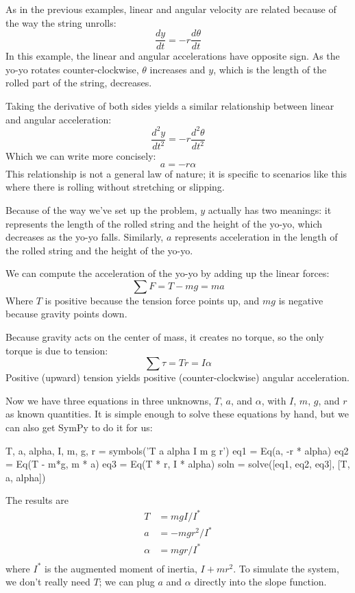 \documentclass[12pt]{book}
\theoremstyle{exercise}
\begin{document}
As in the previous examples, linear and angular velocity are related because of the way the string unrolls:
%
\[ \frac{dy}{dt} = -r \frac{d \theta}{dt} \]
%
In this example, the linear and angular accelerations have opposite sign.  As the yo-yo rotates counter-clockwise, $\theta$ increases and $y$, which is the length of the rolled part of the string, decreases.

Taking the derivative of both sides yields a similar relationship between linear and angular acceleration:
%
\[ \frac{d^2 y}{dt^2} = -r \frac{d^2 \theta}{dt^2} \]
%
Which we can write more concisely:
%
\[ a = -r \alpha \]
%
This relationship is not a general law of nature; it is specific to scenarios like this where there is rolling without stretching or slipping.


Because of the way we've set up the problem, $y$ actually has two meanings: it represents the length of the rolled string and the height of the yo-yo, which decreases as the yo-yo falls.  Similarly, $a$ represents acceleration in the length of the rolled string and the height of the yo-yo.

We can compute the acceleration of the yo-yo by adding up the linear forces:
%
\[ \sum F = T - mg = ma \]
%
Where $T$ is positive because the tension force points up, and $mg$ is negative because gravity points down.

Because gravity acts on the center of mass, it creates no torque, so the only torque is due to tension:
%
\[ \sum \tau = T r = I \alpha \]
%
Positive (upward) tension yields positive (counter-clockwise) angular acceleration.


Now we have three equations in three unknowns, $T$, $a$, and $\alpha$, with $I$, $m$, $g$, and $r$ as known quantities.  It is simple enough to solve these equations by hand, but we can also get SymPy to do it for us:

\begin{python}
T, a, alpha, I, m, g, r = symbols('T a alpha I m g r')
eq1 = Eq(a, -r * alpha)
eq2 = Eq(T - m*g, m * a)
eq3 = Eq(T * r, I * alpha)
soln = solve([eq1, eq2, eq3], [T, a, alpha])
\end{python}

The results are
%
\begin{align*}
T      &= m g I / I^*   \\
a      &= -m g r^2 / I^* \\
\alpha &= m g r / I^*    \\
\end{align*}
%
where $I^*$ is the augmented moment of inertia, $I + m r^2$.
To simulate the system, we don't really need $T$; we can plug $a$ and $\alpha$ directly into the slope function.
\end{document}

